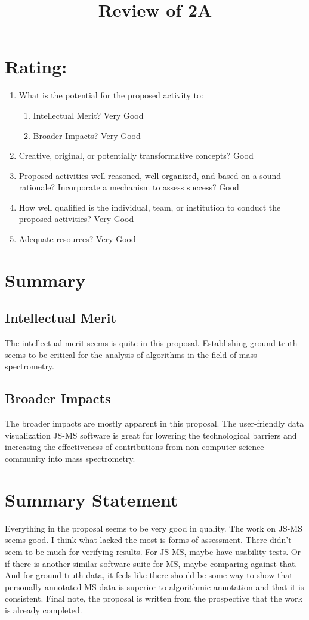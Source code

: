 \documentclass{article}
\title{Review of 2A}
\begin{document}
\maketitle

\section*{Rating:}
\begin{enumerate}
\item What is the potential for the proposed activity to:
  \begin{enumerate}
   \item Intellectual Merit? Very Good
   \item Broader Impacts? Very Good
  \end{enumerate}
\item Creative, original, or potentially transformative concepts? Good
\item Proposed activities well-reasoned, well-organized, and based on a sound rationale? Incorporate a mechanism to assess success? Good
\item How well qualified is the individual, team, or institution to conduct the proposed activities? Very Good
\item Adequate resources? Very Good
\end{enumerate}

\section*{Summary}
\subsection*{Intellectual Merit}
The intellectual merit seems is quite in this proposal.   Establishing ground truth seems to be critical for the analysis of algorithms in the field of mass spectrometry.  

\subsection*{Broader Impacts}
The broader impacts are mostly apparent in this proposal.  The user-friendly data visualization JS-MS software is great for lowering the technological barriers and increasing the effectiveness of contributions from non-computer science community into mass spectrometry.  

\section*{Summary Statement}
Everything in the proposal seems to be very good in quality.  The work on JS-MS seems good.  I think what lacked the most is forms of assessment.  There didn't seem to be much for verifying results.  For JS-MS, maybe have usability tests.  Or if there is another similar software suite for MS, maybe comparing against that.  And for ground truth data, it feels like there should be some way to show that personally-annotated MS data is superior to algorithmic annotation and that it is consistent.  Final note, the proposal is written from the prospective that the work is already completed.
\end{document}

